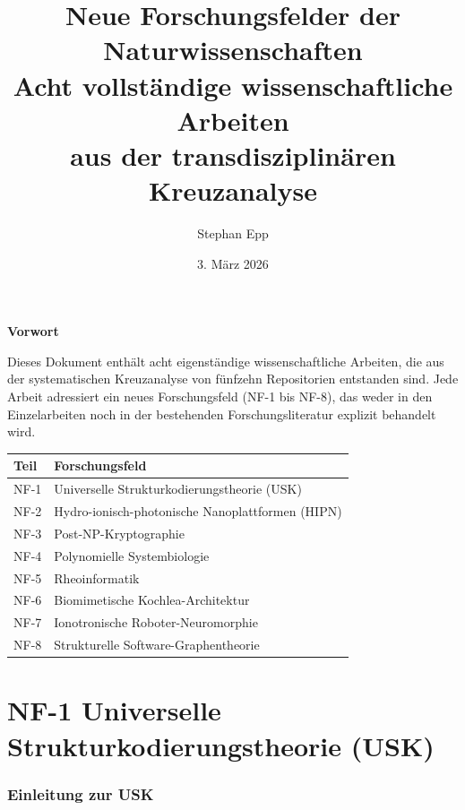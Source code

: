 ﻿\documentclass[a4paper,12pt]{scrreprt}
\title{\textbf{Neue Forschungsfelder der Naturwissenschaften}\\[0.8ex]
  \large Acht vollständige wissenschaftliche Arbeiten\\
  aus der transdisziplinären Kreuzanalyse}
\author{Stephan Epp}
\date{3. März 2026}
\theoremstyle{definition}
\begin{document}
\maketitle
\newpage

\begin{center}
\Large\textbf{Vorwort}
\end{center}
\bigskip
Dieses Dokument enthält acht eigenständige wissenschaftliche Arbeiten,
die aus der systematischen Kreuzanalyse von fünfzehn Repositorien
entstanden sind. Jede Arbeit adressiert ein neues Forschungsfeld (NF-1
bis NF-8), das weder in den Einzelarbeiten noch in der bestehenden
Forschungsliteratur explizit behandelt wird.

\medskip
\begin{center}
\begin{tabular}{ll}
\toprule
\textbf{Teil} & \textbf{Forschungsfeld} \\
\midrule
NF-1 & Universelle Strukturkodierungstheorie (USK) \\
NF-2 & Hydro-ionisch-photonische Nanoplattformen (HIPN) \\
NF-3 & Post-NP-Kryptographie \\
NF-4 & Polynomielle Systembiologie \\
NF-5 & Rheoinformatik \\
NF-6 & Biomimetische Kochlea-Architektur \\
NF-7 & Ionotronische Roboter-Neuromorphie \\
NF-8 & Strukturelle Software-Graphentheorie \\
\bottomrule
\end{tabular}
\end{center}

\newpage
\tableofcontents
\newpage

\part{NF-1 \quad Universelle Strukturkodierungstheorie (USK)}
\label{part:nf1}

\section{Einleitung zur USK}
\end{document}
